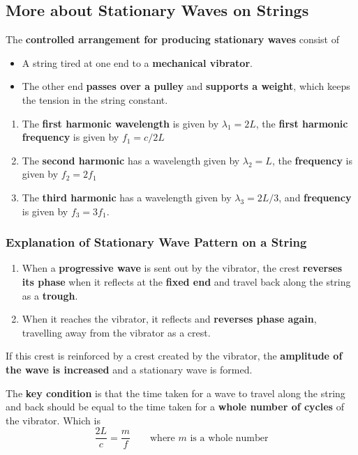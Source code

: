 \subsection{More about Stationary Waves on Strings}

The \textbf{controlled arrangement for producing stationary waves} consist of
\begin{itemize}
    \item A string tired at one end to a \textbf{mechanical vibrator}.
    \item The other end \textbf{passes over a pulley} and \textbf{supports a weight}, which keeps the tension in the string constant.
\end{itemize}

\begin{enumerate}
    \item The \textbf{first harmonic wavelength} is given by $\lambda_1=2L$, the \textbf{first harmonic frequency} is given by $f_1=c/2L$
    \item The \textbf{second harmonic} has a wavelength given by $\lambda_2=L$, the \textbf{frequency} is given by $f_2=2f_1$
    \item The \textbf{third harmonic} has a wavelength given by $\lambda_3=2L/3$, and \textbf{frequency} is given by $f_3=3f_1$.
\end{enumerate}

\subsubsection*{Explanation of Stationary Wave Pattern on a String}
\begin{enumerate}
    \item When a \textbf{progressive wave} is sent out by the vibrator, the crest \textbf{reverses its phase} when it reflects at the \textbf{fixed end} and travel back along the string as a \textbf{trough}.
    \item When it reaches the vibrator, it reflects and \textbf{reverses phase again}, travelling away from the vibrator as a crest.
\end{enumerate}
If this crest is reinforced by a crest created by the vibrator, the \textbf{amplitude of the wave is increased} and a stationary wave is formed.

The \textbf{key condition} is that the time taken for a wave to travel along the string and back should be equal to the time taken for a \textbf{whole number of cycles} of the vibrator. Which is
$$\frac{2L}{c}=\frac{m}{f}\qquad\text{where $m$ is a whole number}$$

